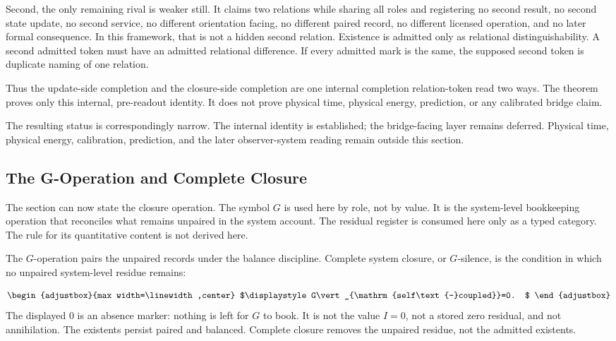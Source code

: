 Second, the only remaining rival is weaker still. It claims two relations while sharing all roles and registering no second result, no second state update, no second service, no different orientation facing, no different paired record, no different licensed operation, and no later formal consequence. In this framework, that is not a hidden second relation. Existence is admitted only as relational distinguishability. A second admitted token must have an admitted relational difference. If every admitted mark is the same, the supposed second token is duplicate naming of one relation.

Thus the update-side completion and the closure-side completion are one internal completion relation-token read two ways. The theorem proves only this internal, pre-readout identity. It does not prove physical time, physical energy, prediction, or any calibrated bridge claim.

The resulting status is correspondingly narrow. The internal identity is established; the bridge-facing layer remains deferred. Physical time, physical energy, calibration, prediction, and the later observer-system reading remain outside this section.

\subsection{The G-Operation and Complete Closure}
The section can now state the closure operation. The symbol \(G\) is used here by role, not by value. It is the system-level bookkeeping operation that reconciles what remains unpaired in the system account. The residual register is consumed here only as a typed category. The rule for its quantitative content is not derived here.

The \(G\)-operation pairs the unpaired records under the balance discipline. Complete system closure, or \(G\)-silence, is the condition in which no unpaired system-level residue remains:

\begin{equation*}
\begin{adjustbox}{max width=\linewidth,center}
$\displaystyle
G\vert_{\mathrm{self\text{-}coupled}}=0.
$
\end{adjustbox}
\end{equation*}
The displayed \(0\) is an absence marker: nothing is left for \(G\) to book. It is not the value \(I=0\), not a stored zero residual, and not annihilation. The existents persist paired and balanced. Complete closure removes the unpaired residue, not the admitted existents.


